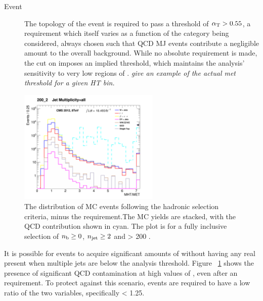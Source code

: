 \begin{description}
\item[Event]
The topology of the event is required to pass a threshold of $\alpha_{\text{T}} > 0.55$, 
a requirement which itself varies as a function of the \HT category being
considered, always
chosen such that QCD MJ events contribute a negligible amount to the overall 
background. While no absolute \met requirement is made, the cut on 
\alphat imposes an implied threshold, which maintains the analysis'
sensitivity to very low regions of \met. \emph{give an example of the actual met
threshold for a given HT bin.}

\end{description}

\begin{figure}[ht!]
\centering
\includegraphics[width=0.6\textwidth]
{Figs/datamc/had/v1/Stacked_MHTovMET_all_200_upwards.png}
\caption{The \mhtmet distribution of MC events following the hadronic selection
criteria, minus the \mhtmet requirement.The MC yields are stacked,
with the QCD contribution shown in cyan. The plot is for a fully inclusive
selection of $n_{\text{b}} \geq 0$, $n_{\text{jet}} \geq 2$ and \HT > 200 \gev.}
\label{fig:full_mhtmet_distro}
\end{figure}


It is possible for events to acquire significant amounts of \mht without having any
real \met present when multiple jets are below the analysis threshold. Figure
~\ref{fig:full_mhtmet_distro} shows the presence of significant QCD contamination
at high values of \mhtmet, even after an \alphat requirement. To protect against
this scenario, events are required to have a low ratio of the two variables,
specifically \mhtmet < 1.25.

